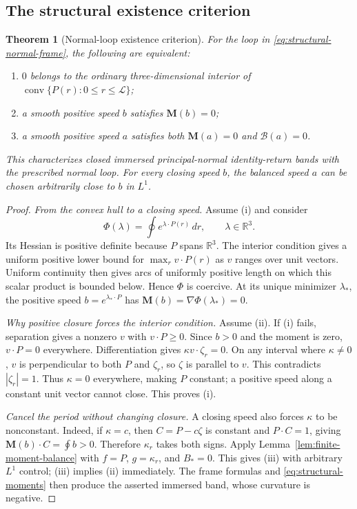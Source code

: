 \documentclass[11pt]{amsart}
\newtheorem{theorem}{Theorem}[section]
\theoremstyle{definition}
\theoremstyle{remark}
\newcommand{\R}{\mathbb R}\newcommand{\Sph}{\mathbb S}
\DeclareMathOperator{\conv}{conv}\DeclareMathOperator{\Stab}{Stab}
\numberwithin{equation}{section}
\begin{document}
\subsection{The structural existence criterion}
\begin{theorem}[Normal-loop existence criterion]\label{thm:normal-loop-criterion}
For the loop in \eqref{eq:structural-normal-frame}, the following are
equivalent:
\begin{enumerate}[label=\textup{(\roman*)}]
\item $0$ belongs to the ordinary three-dimensional interior of
$\conv\{P(r):0\le r\le\mathcal L\}$;
\item a smooth positive speed $b$ satisfies $\mathbf M(b)=0$;
\item a smooth positive speed $a$ satisfies both
$\mathbf M(a)=0$ and $\mathscr B(a)=0$.
\end{enumerate}
This characterizes closed immersed principal-normal identity-return bands
with the prescribed normal loop. For every closing speed $b$, the balanced
speed $a$ can be chosen arbitrarily close to $b$ in $L^1$.
\end{theorem}
\begin{proof}
\emph{From the convex hull to a closing speed.}
Assume (i) and consider
\[
 \Phi(\lambda)=\oint e^{\lambda\cdot P(r)}\,dr,
 \qquad \lambda\in\R^3.
\]
Its Hessian is positive definite because $P$ spans $\R^3$. The interior
condition gives a uniform positive lower bound for
$\max_r v\cdot P(r)$ as $v$ ranges over unit vectors. Uniform continuity
then gives arcs of uniformly positive length on which this scalar product
is bounded below. Hence $\Phi$ is coercive. At its unique minimizer
$\lambda_*$, the positive speed $b=e^{\lambda_*\cdot P}$ has
$\mathbf M(b)=\nabla\Phi(\lambda_*)=0$.

\emph{Why positive closure forces the interior condition.}
Assume (ii). If (i) fails, separation gives a nonzero $v$ with
$v\cdot P\ge0$. Since $b>0$ and the moment is zero, $v\cdot P=0$
everywhere. Differentiation gives $\kappa v\cdot\zeta_r=0$.
On any interval where $\kappa\ne0$, $v$ is perpendicular to both
$P$ and $\zeta_r$, so $\zeta$ is parallel to $v$. This contradicts
$|\zeta_r|=1$. Thus $\kappa=0$ everywhere, making $P$ constant;
a positive speed along a constant unit vector cannot close. This proves (i).

\emph{Cancel the period without changing closure.}
A closing speed also forces $\kappa$ to be nonconstant. Indeed, if
$\kappa=c$, then $C=P-c\zeta$ is constant and $P\cdot C=1$, giving
$\mathbf M(b)\cdot C=\oint b>0$. Therefore $\kappa_r$ takes both signs.
Apply Lemma~\ref{lem:finite-moment-balance} with $f=P$, $g=\kappa_r$,
and $B_*=0$. This gives (iii) with arbitrary $L^1$ control; (iii) implies
(ii) immediately. The frame formulas and \eqref{eq:structural-moments}
then produce the asserted immersed band, whose curvature is negative.
\end{proof}
\end{document}
